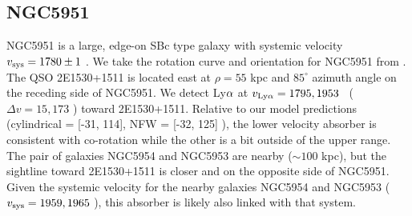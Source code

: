 
%




\subsection{NGC5951}
NGC5951 is a large, edge-on SBc type galaxy with systemic velocity $v_{\rm sys} = 1780 \pm 1$ \kms. We take the rotation curve and orientation for NGC5951 from \cite{rhee1996}. The QSO 2E1530+1511 is located east at $\rho = 55$ kpc and $85^{\circ}$ azimuth angle on the receding side of NGC5951. We detect Ly$\rm \alpha$ at $v_{\rm Ly\alpha} = 1795, 1953$ \kms~($\Delta v = 15, 173$ \kms) toward 2E1530+1511. Relative to our model predictions (cylindrical = [-31, 114], NFW = [-32, 125] \kms), the lower velocity absorber is consistent with co-rotation while the other is a bit outside of the upper range. The pair of galaxies NGC5954 and NGC5953 are nearby ($\sim 100$ kpc), but the sightline toward 2E1530+1511 is closer and on the opposite side of NGC5951. Given the systemic velocity for the nearby galaxies NGC5954 and NGC5953 ($v_{\rm sys} = 1959, 1965$ \kms), this absorber is likely also linked with that system.


